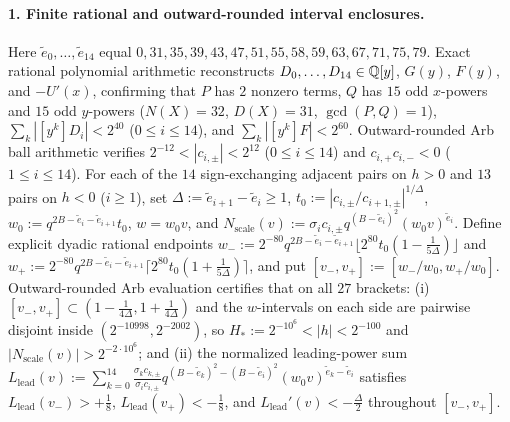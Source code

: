 \paragraph{1. Finite rational and outward-rounded interval enclosures.}
Here $\tilde{e}_0,\dots,\tilde{e}_{14}$ equal $0,31,35,39,43,47,51,55,58,59,63,67,71,75,79$. Exact rational polynomial arithmetic reconstructs $D_0,\dots,D_{14}\in\mathbb{Q}[y]$, $G(y)$, $F(y)$, and $-U'(x)$, confirming that $P$ has $2$ nonzero terms, $Q$ has $15$ odd $x$-powers and $15$ odd $y$-powers ($N(X)=32$, $D(X)=31$, $\gcd(P,Q)=1$), $\sum_k|[y^k]D_i|<2^{40}$ ($0\le i\le 14$), and $\sum_k|[y^k]F|<2^{60}$. Outward-rounded Arb ball arithmetic verifies $2^{-12}<|c_{i,\pm}|<2^{12}$ ($0\le i\le 14$) and $c_{i,+}c_{i,-}<0$ ($1\le i\le 14$). For each of the $14$ sign-exchanging adjacent pairs on $h>0$ and $13$ pairs on $h<0$ ($i\ge 1$), set $\Delta:=\tilde{e}_{i+1}-\tilde{e}_i\ge 1$, $t_0:=|c_{i,\pm}/c_{i+1,\pm}|^{1/\Delta}$, $w_0:=q^{2B-\tilde{e}_i-\tilde{e}_{i+1}}t_0$, $w=w_0 v$, and $N_{\mathrm{scale}}(v):=\sigma_i c_{i,\pm}q^{(B-\tilde{e}_i)^2}(w_0 v)^{\tilde{e}_i}$. Define explicit dyadic rational endpoints $w_-:=2^{-80}q^{2B-\tilde{e}_i-\tilde{e}_{i+1}}\lfloor 2^{80}t_0(1-\frac{1}{5\Delta})\rfloor$ and $w_+:=2^{-80}q^{2B-\tilde{e}_i-\tilde{e}_{i+1}}\lceil 2^{80}t_0(1+\frac{1}{5\Delta})\rceil$, and put $[v_-,v_+]:=[w_-/w_0,w_+/w_0]$. Outward-rounded Arb evaluation certifies that on all $27$ brackets: (i) $[v_-,v_+]\subset(1-\frac{1}{4\Delta},1+\frac{1}{4\Delta})$ and the $w$-intervals on each side are pairwise disjoint inside $(2^{-10998},2^{-2002})$, so $H_*:=2^{-10^6}<|h|<2^{-100}$ and $|N_{\mathrm{scale}}(v)|>2^{-2\cdot 10^6}$; and (ii) the normalized leading-power sum $L_{\mathrm{lead}}(v):=\sum_{k=0}^{14}\frac{\sigma_k c_{k,\pm}}{\sigma_i c_{i,\pm}}q^{(B-\tilde{e}_k)^2-(B-\tilde{e}_i)^2}(w_0 v)^{\tilde{e}_k-\tilde{e}_i}$ satisfies $L_{\mathrm{lead}}(v_-)>+\frac{1}{8}$, $L_{\mathrm{lead}}(v_+)<-\frac{1}{8}$, and $L_{\mathrm{lead}}'(v)<-\frac{\Delta}{2}$ throughout $[v_-,v_+]$.

